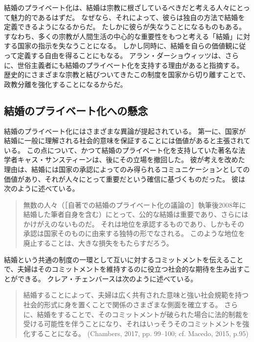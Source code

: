 \documentclass[paper=a4,book,openany]{jlreq} \usepackage{mystyle}
\begin{document}
結婚のプライベート化は、結婚は宗教に根ざしているべきだと考える人々にとって魅力的であるはずだ。
なぜなら、それによって、彼らは独自の方法で結婚を定義できるようになるからだ。
たしかに彼らが失なうことになるものもある。
すなわち、多くの宗教が人間生活の中心的な重要性をもつと考える「結婚」に対する国家の指示を失なうことになる。
しかし同時に、結婚を自らの価値観に従って定義する自由を得ることにもなる。
アラン・ダーショウィッツは、さらに、世俗主義者にも結婚のプライベート化を支持する理由があると指摘する。
歴史的にさまざまな宗教と結びついてきたこの制度を国家から切り離すことで、政教分離を強化することになるからだ\citep{dershowitz03:_to_fix_gay_dilem_gover}。

\subsection{結婚のプライベート化への懸念}

結婚のプライベート化にはさまざまな異論が提起されている。
第一に、国家が結婚に一般に理解される社会的意味を保証することには価値があると主張されている。
この点について、かつて結婚のプライベート化を支持していた著名な法学者キャス・サンスティーンは、後にその立場を撤回した。
彼が考えを改めた理由は、結婚には国家の承認によってのみ得られるコミュニケーションとしての価値があり、それが人々にとって重要だという確信に基づくものだった。
彼は次のように述べている。

\begin{quote}
無数の人々（［自著での結婚のプライベート化の議論の］執筆後2008年に結婚した筆者自身を含む）にとって、公的な結婚は重要であり、さらにはかけがえのないものだ。
それは地位を承認するものであり、しかもその承認は国家そのものに由来する独特の形でなされる。
このような地位を廃止することは、大きな損失をもたらすだろう。
\citep[p.296]{sunstein17:_statem_i_most_regret}
\end{quote}

結婚という共通の制度の一環として互いに対するコミットメントを伝えることで、夫婦はそのコミットメントを維持するのに役立つ社会的な期待を生み出すことができる。
クレア・チェンバースは次のように述べている。

\begin{quote}
結婚することによって、夫婦は広く共有された意味と強い社会規範を持つ社会的形式に身を置くことで関係のさまざまな側面を確立する。
さらに、結婚をすることで、そのコミットメントが破られた場合に法的制裁を受ける可能性を伴うことになり、それはいっそうそのコミットメントを強化することになる。
(Chambers, 2017, pp. 99--100; cf. Macedo, 2015, p.95) \nocite{chambers17:againstmarriage} \nocite{macedo15:_just_married}
\end{quote}
\end{document}
